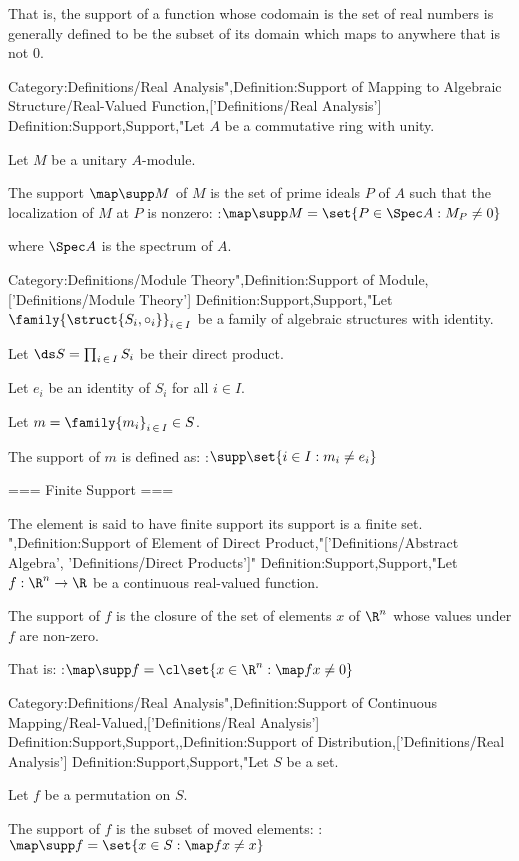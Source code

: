 That is, the support of a function whose codomain is the set of real numbers is generally defined to be the subset of its domain which maps to anywhere that is not $0$.

Category:Definitions/Real Analysis",Definition:Support of Mapping to Algebraic Structure/Real-Valued Function,['Definitions/Real Analysis']
Definition:Support,Support,"Let $A$ be a commutative ring with unity.

Let $M$ be a unitary $A$-module.


The support $\map \supp M$ of $M$ is the set of prime ideals $P$ of $A$ such that the localization of $M$ at $P$ is nonzero:
:$\map \supp M = \set {P \in \Spec A : M_P \ne 0}$

where $\Spec A$ is the spectrum of $A$.

Category:Definitions/Module Theory",Definition:Support of Module,['Definitions/Module Theory']
Definition:Support,Support,"Let $\family {\struct {S_i, \circ_i} }_{i \mathop \in I}$ be a family of algebraic structures with identity.

Let $\ds S = \prod_{i \mathop \in I} S_i$ be their direct product.

Let $e_i$ be an identity of $S_i$ for all $i \in I$.

Let $m = \family {m_i}_{i \mathop \in I} \in S$.


The support of $m$ is defined as:
:$\supp \set {i \in I: m_i \ne e_i}$




=== Finite Support ===

The element is said to have finite support  its support is a finite set.
",Definition:Support of Element of Direct Product,"['Definitions/Abstract Algebra', 'Definitions/Direct Products']"
Definition:Support,Support,"Let $f: \R^n \to \R$ be a continuous real-valued function.

The support of $f$ is the closure of the set of elements $x$ of $\R^n$ whose values under $f$ are non-zero.

That is:
:$\map \supp f = \cl \set {x \in \R^n: \map f x \ne 0}$


Category:Definitions/Real Analysis",Definition:Support of Continuous Mapping/Real-Valued,['Definitions/Real Analysis']
Definition:Support,Support,,Definition:Support of Distribution,['Definitions/Real Analysis']
Definition:Support,Support,"Let $S$ be a set.

Let $f$ be a permutation on $S$.


The support of $f$ is the subset of moved elements:
:$\map \supp f = \set {x \in S: \map f x \ne x}$



